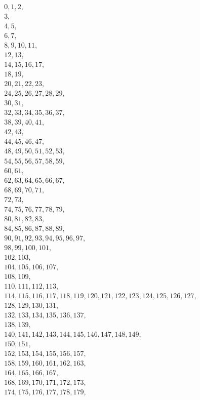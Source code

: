\nextlipsum
\begin{multline}
0, 1, 2, \\
3, \\
4, 5, \\
6, 7, \\
8, 9, 10, 11, \\
12, 13, \\
14, 15, 16, 17, \\
18, 19, \\
20, 21, 22, 23, \\
24, 25, 26, 27, 28, 29, \\
30, 31, \\
32, 33, 34, 35, 36, 37, \\
38, 39, 40, 41, \\
42, 43, \\
44, 45, 46, 47, \\
48, 49, 50, 51, 52, 53, \\
54, 55, 56, 57, 58, 59, \\
60, 61, \\
62, 63, 64, 65, 66, 67, \\
68, 69, 70, 71, \\
72, 73, \\
74, 75, 76, 77, 78, 79, \\
80, 81, 82, 83, \\
84, 85, 86, 87, 88, 89, \\
90, 91, 92, 93, 94, 95, 96, 97, \\
98, 99, 100, 101, \\
102, 103, \\
104, 105, 106, 107, \\
108, 109, \\
110, 111, 112, 113, \\
114, 115, 116, 117, 118, 119, 120, 121, 122, 123, 124, 125, 126, 127, \\
128, 129, 130, 131, \\
132, 133, 134, 135, 136, 137, \\
138, 139, \\
140, 141, 142, 143, 144, 145, 146, 147, 148, 149, \\
150, 151, \\
152, 153, 154, 155, 156, 157, \\
158, 159, 160, 161, 162, 163, \\
164, 165, 166, 167, \\
168, 169, 170, 171, 172, 173, \\
174, 175, 176, 177, 178, 179, \\

\end{multline}
